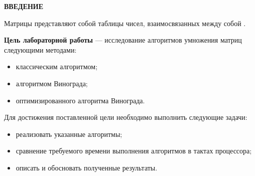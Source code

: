 \begin{center}
    \textbf{ВВЕДЕНИЕ}
\end{center}

Матрицы представляют собой таблицы чисел, взаимосвязанных между собой \cite{bib0}.

\textbf{Цель лабораторной работы} --- исследование алгоритмов умножения матриц следующими
методами:
\begin{itemize}
    \item классическим алгоритмом;
    \item алгоритмом Винограда;
    \item оптимизированного алгоритма Винограда.
\end{itemize}

Для достижения поставленной цели необходимо выполнить следующие задачи:
\begin{itemize}
    \item реализовать указанные алгоритмы;
    \item сравнение требуемого времени выполнения алгоритмов в тактах процессора;
    \item описать и обосновать полученные результаты.
\end{itemize}

